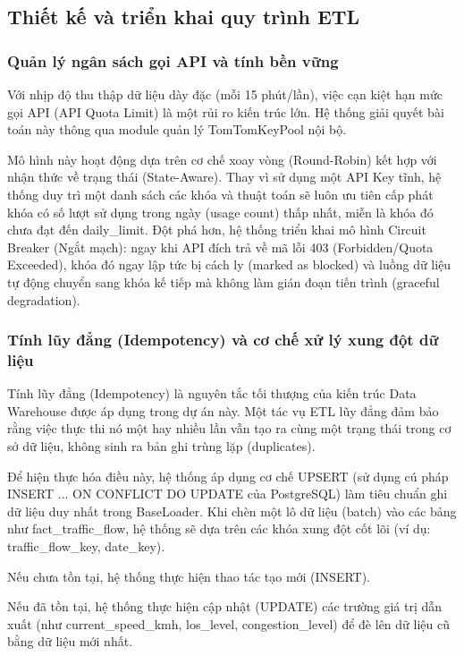 \subsection{Thiết kế và triển khai quy trình ETL}
\subsubsection{Quản lý ngân sách gọi API và tính bền vững}
Với nhịp độ thu thập dữ liệu dày đặc (mỗi 15 phút/lần), việc cạn kiệt hạn mức gọi API (API Quota Limit) là một rủi ro kiến trúc lớn. Hệ thống giải quyết bài toán này thông qua module quản lý TomTomKeyPool nội bộ.


Mô hình này hoạt động dựa trên cơ chế xoay vòng (Round-Robin) kết hợp với nhận thức về trạng thái (State-Aware). Thay vì sử dụng một API Key tĩnh, hệ thống duy trì một danh sách các khóa và thuật toán sẽ luôn ưu tiên cấp phát khóa có số lượt sử dụng trong ngày (usage count) thấp nhất, miễn là khóa đó chưa đạt đến daily\_limit. Đột phá hơn, hệ thống triển khai mô hình Circuit Breaker (Ngắt mạch): ngay khi API đích trả về mã lỗi 403 (Forbidden/Quota Exceeded), khóa đó ngay lập tức bị cách ly (marked as blocked) và luồng dữ liệu tự động chuyển sang khóa kế tiếp mà không làm gián đoạn tiến trình (graceful degradation).


\subsubsection{Tính lũy đẳng (Idempotency) và cơ chế xử lý xung đột dữ liệu}
Tính lũy đẳng (Idempotency) là nguyên tắc tối thượng của kiến trúc Data Warehouse được áp dụng trong dự án này. Một tác vụ ETL lũy đẳng đảm bảo rằng việc thực thi nó một hay nhiều lần vẫn tạo ra cùng một trạng thái trong cơ sở dữ liệu, không sinh ra bản ghi trùng lặp (duplicates).


Để hiện thực hóa điều này, hệ thống áp dụng cơ chế UPSERT (sử dụng cú pháp INSERT ... ON CONFLICT DO UPDATE của PostgreSQL) làm tiêu chuẩn ghi dữ liệu duy nhất trong BaseLoader. Khi chèn một lô dữ liệu (batch) vào các bảng như fact\_traffic\_flow, hệ thống sẽ dựa trên các khóa xung đột cốt lõi (ví dụ: traffic\_flow\_key, date\_key).


Nếu chưa tồn tại, hệ thống thực hiện thao tác tạo mới (INSERT).


Nếu đã tồn tại, hệ thống thực hiện cập nhật (UPDATE) các trường giá trị dẫn xuất (như current\_speed\_kmh, los\_level, congestion\_level) để đè lên dữ liệu cũ bằng dữ liệu mới nhất.


